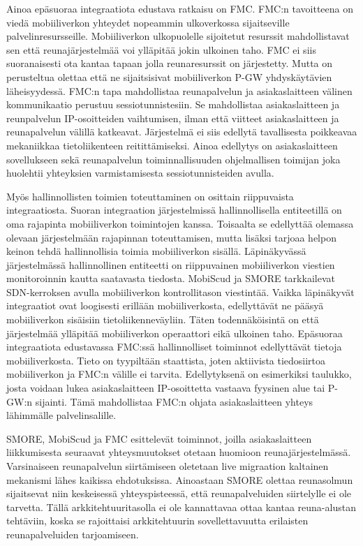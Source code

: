 Ainoa epäsuoraa integraatiota edustava ratkaisu on FMC.
FMC:n tavoitteena on viedä mobiiliverkon yhteydet nopeammin ulkoverkossa sijaitseville palvelinresursseille. Mobiiliverkon ulkopuolelle sijoitetut resurssit mahdollistavat sen että reunajärjestelmää voi ylläpitää jokin ulkoinen taho.
FMC ei siis suoranaisesti ota kantaa tapaan jolla reunaresurssit on järjestetty. Mutta on perusteltua olettaa että ne sijaitsisivat mobiiliverkon P-GW yhdyskäytävien läheisyydessä.
FMC:n tapa mahdollistaa reunapalvelun ja asiakaslaitteen välinen kommunikaatio perustuu sessiotunnistesiin. Se mahdollistaa asiakaslaitteen ja reunpalvelun IP-osoitteiden vaihtumisen, ilman että viitteet asiakaslaitteen ja reunapalvelun välillä katkeavat. Järjestelmä ei siis edellytä tavallisesta poikkeavaa mekaniikkaa tietoliikenteen reitittämiseksi. Ainoa edellytys on asiakaslaitteen sovellukseen sekä reunapalvelun toiminnallisuuden ohjelmallisen toimijan joka huolehtii yhteyksien varmistamisesta sessiotunnisteiden avulla.

Myös hallinnollisten toimien toteuttaminen on osittain riippuvaista integraatiosta. Suoran integraation järjestelmissä hallinnollisella entiteetillä on oma rajapinta mobiiliverkon toimintojen kanssa. 
Toisaalta se edellyttää olemassa olevaan järjestelmään rajapinnan toteuttamisen, mutta lisäksi tarjoaa helpon keinon tehdä hallinnollisia toimia mobiiliverkon sisällä. 
Läpinäkyvässä järjestelmässä hallinnollinen entiteetti on riippuvainen mobiiliverkon viestien monitoroinnin kautta saatavasta tiedosta. 
MobiScud ja SMORE tarkkailevat SDN-kerroksen avulla mobiiliverkon kontrollitason viestintää. 
Vaikka läpinäkyvät integraatiot ovat loogisesti erillään mobiiliverkosta, edellyttävät ne pääsyä mobiiliverkon sisäisiin tietoliikenneväyliin.
Täten todennäköisintä on että järjestelmää ylläpitää mobiiliverkon operaattori eikä ulkoinen taho. 
Epäsuoraa integraatiota edustavassa FMC:ssä hallinnolliset toiminnot edellyttävät tietoja mobiiliverkosta. Tieto on tyypiltään staattista, joten aktiivista tiedosiirtoa mobiiliverkon ja FMC:n välille ei tarvita.
Edellytyksenä on esimerkiksi taulukko, josta voidaan lukea asiakaslaitteen IP-osoittetta vastaava fyysinen alue tai P-GW:n sijainti. Tämä mahdollistaa FMC:n ohjata asiakaslaitteen yhteys lähimmälle palvelinsalille. 


SMORE, MobiScud ja FMC esittelevät toiminnot, joilla asiakaslaitteen liikkumisesta seuraavat yhteysmuutokset otetaan huomioon reunajärjestelmässä.
Varsinaiseen reunapalvelun siirtämiseen oletetaan live migraation kaltainen mekanismi lähes kaikissa ehdotuksissa. Ainoastaan SMORE olettaa reunasolmun sijaitsevat niin keskeisessä yhteyspisteessä, että reunapalveluiden siirtelylle ei ole tarvetta.
Tällä arkkitehtuuritasolla ei ole kannattavaa ottaa kantaa reuna-alustan tehtäviin, koska se rajoittaisi arkkitehtuurin sovellettavuutta erilaisten reunapalveluiden tarjoamiseen.

